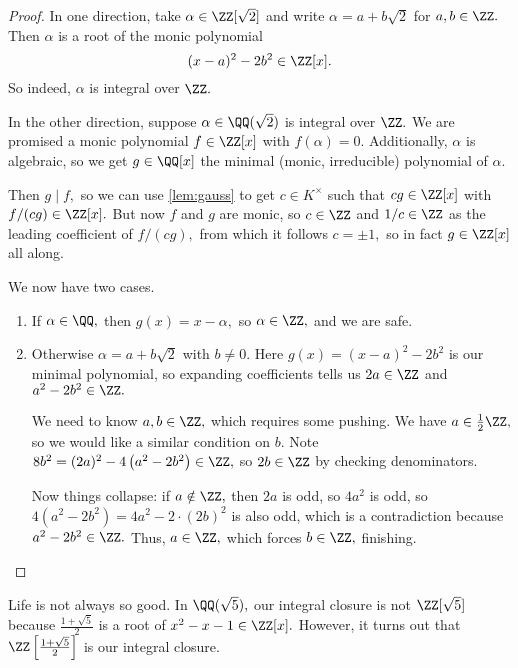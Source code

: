 \documentclass[../notes.tex]{subfiles}
\begin{document}
\begin{proof}
    In one direction, take $\alpha\in\ZZ[\sqrt2]$ and write $\alpha=a+b\sqrt2$ for $a,b\in\ZZ.$ Then $\alpha$ is a root of the monic polynomial
    \[(x-a)^2-2b^2\in\ZZ[x].\]
    So indeed, $\alpha$ is integral over $\ZZ.$
    
    In the other direction, suppose $\alpha\in\QQ(\sqrt2)$ is integral over $\ZZ.$ We are promised a monic polynomial $f\in\ZZ[x]$ with $f(\alpha)=0.$ Additionally, $\alpha$ is algebraic, so we get $g\in\QQ[x]$ the minimal (monic, irreducible) polynomial of $\alpha.$
    
    Then $g\mid f,$ so we can use \autoref{lem:gauss} to get $c\in K^\times$ such that $cg\in\ZZ[x]$ with $f/(cg)\in\ZZ[x].$ But now $f$ and $g$ are monic, so $c\in\ZZ$ and $1/c\in\ZZ$ as the leading coefficient of $f/(cg),$ from which it follows $c=\pm1,$ so in fact $g\in\ZZ[x]$ all along.
    
    We now have two cases.
    \begin{enumerate}
        \item If $\alpha\in\QQ,$ then $g(x)=x-\alpha,$ so $\alpha\in\ZZ,$ and we are safe.
        \item Otherwise $\alpha=a+b\sqrt2$ with $b\ne0.$ Here $g(x)=(x-a)^2-2b^2$ is our minimal polynomial, so expanding coefficients tells us $2a\in\ZZ$ and $a^2-2b^2\in\ZZ.$
        
        We need to know $a,b\in\ZZ,$ which requires some pushing. We have $a\in\frac12\ZZ,$ so we would like a similar condition on $b.$ Note $8b^2=(2a)^2-4\left(a^2-2b^2\right)\in\ZZ,$ so $2b\in\ZZ$ by checking denominators.
        
        Now things collapse: if $a\notin\ZZ,$ then $2a$ is odd, so $4a^2$ is odd, so $4\left(a^2-2b^2\right)=4a^2-2\cdot(2b)^2$ is also odd, which is a contradiction because $a^2-2b^2\in\ZZ.$ Thus, $a\in\ZZ,$ which forces $b\in\ZZ,$ finishing.
        \qedhere
    \end{enumerate}
\end{proof}
\begin{remark}
    Life is not always so good. In $\QQ(\sqrt5),$ our integral closure is not $\ZZ[\sqrt5]$ because $\frac{1+\sqrt5}2$ is a root of $x^2-x-1\in\ZZ[x].$ However, it turns out that $\ZZ\left[\frac{1+\sqrt5}2\right]$ is our integral closure.
\end{remark}
\end{document}
